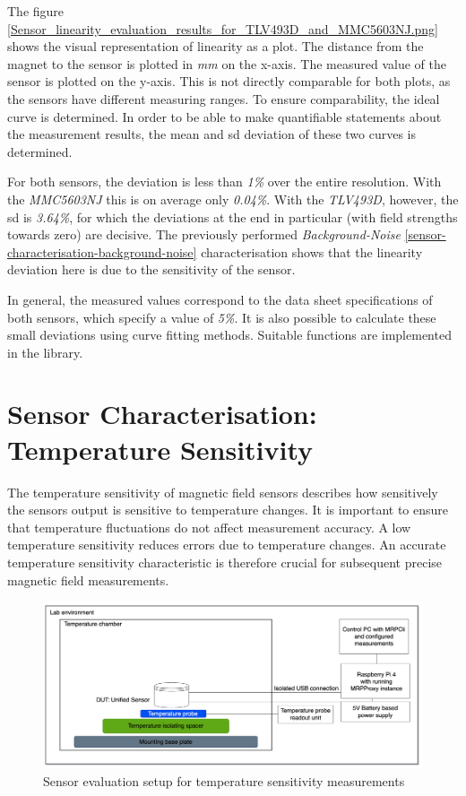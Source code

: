 The figure
\ref{Sensor_linearity_evaluation_results_for_TLV493D_and_MMC5603NJ.png}
shows the visual representation of linearity as a plot. The distance
from the magnet to the sensor is plotted in \emph{mm} on the x-axis. The
measured value of the sensor is plotted on the y-axis. This is not
directly comparable for both plots, as the sensors have different
measuring ranges. To ensure comparability, the ideal curve is
determined. In order to be able to make quantifiable statements about
the measurement results, the mean and \gls{sd} deviation of these two
curves is determined.

For both sensors, the deviation is less than \emph{1\%} over the entire
resolution. With the \emph{MMC5603NJ} this is on average only
\emph{0.04\%}. With the \emph{TLV493D}, however, the \gls{sd} is
\emph{3.64\%}, for which the deviations at the end in particular (with
field strengths towards zero) are decisive. The previously performed
\emph{Background-Noise} \ref{sensor-characterisation-background-noise}
characterisation shows that the linearity deviation here is due to the
sensitivity of the sensor.

In general, the measured values correspond to the data sheet
specifications of both sensors, which specify a value of \emph{5\%}. It
is also possible to calculate these small deviations using curve fitting
methods. Suitable functions are implemented in the library.

\hypertarget{sensor-characterisation-temperature-sensitivity}{%
\section{Sensor Characterisation: Temperature
Sensitivity}\label{sensor-characterisation-temperature-sensitivity}}

The temperature sensitivity of magnetic field sensors describes how
sensitively the sensors output is sensitive to temperature changes. It
is important to ensure that temperature fluctuations do not affect
measurement accuracy. A low temperature sensitivity reduces errors due
to temperature changes. An accurate temperature sensitivity
characteristic is therefore crucial for subsequent precise magnetic
field measurements.

\begin{figure}
\centering
\includegraphics{./generated_images/border_Sensor_evaluation_setup_for_temperature_sensitivity_measurements.png}
\caption{Sensor evaluation setup for temperature sensitivity
measurements
\label{Sensor_evaluation_setup_for_temperature_sensitivity_measurements.png}}
\end{figure}


